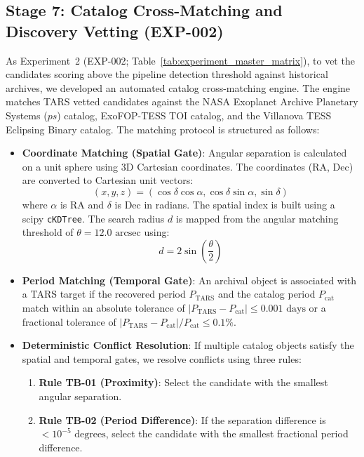 \subsection{Stage 7: Catalog Cross-Matching and Discovery Vetting (EXP-002)} \label{sec:method_exp2_crossmatch}
As Experiment~2 (EXP-002; Table~\ref{tab:experiment_master_matrix}), to vet the candidates scoring above the pipeline detection threshold against historical archives, we developed an automated catalog cross-matching engine. The engine matches TARS vetted candidates against the NASA Exoplanet Archive Planetary Systems ($ps$) catalog, ExoFOP-TESS TOI catalog, and the Villanova TESS Eclipsing Binary catalog. The matching protocol is structured as follows:
\begin{itemize}
    \item \textbf{Coordinate Matching (Spatial Gate)}: Angular separation is calculated on a unit sphere using 3D Cartesian coordinates. The coordinates (RA, Dec) are converted to Cartesian unit vectors:
    \begin{equation}
    (x, y, z) = (\cos\delta \cos\alpha, \cos\delta \sin\alpha, \sin\delta)
    \end{equation}
    where $\alpha$ is RA and $\delta$ is Dec in radians. The spatial index is built using a scipy \texttt{cKDTree}. The search radius $d$ is mapped from the angular matching threshold of $\theta = 12.0\text{ arcsec}$ using:
    \begin{equation}
    d = 2\sin\left(\frac{\theta}{2}\right)
    \end{equation}
    \item \textbf{Period Matching (Temporal Gate)}: An archival object is associated with a TARS target if the recovered period $P_{\text{TARS}}$ and the catalog period $P_{\text{cat}}$ match within an absolute tolerance of $|P_{\text{TARS}} - P_{\text{cat}}| \le 0.001\text{ days}$ or a fractional tolerance of $|P_{\text{TARS}} - P_{\text{cat}}| / P_{\text{cat}} \le 0.1\%$.
    \item \textbf{Deterministic Conflict Resolution}: If multiple catalog objects satisfy the spatial and temporal gates, we resolve conflicts using three rules:
        \begin{enumerate}
            \item \textbf{Rule TB-01 (Proximity)}: Select the candidate with the smallest angular separation.
            \item \textbf{Rule TB-02 (Period Difference)}: If the separation difference is $< 10^{-5}\text{ degrees}$, select the candidate with the smallest fractional period difference.

\end{enumerate}
\end{itemize}
